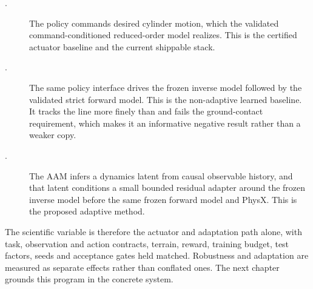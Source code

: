 \begin{description}
  \item[\ppoROM.] The policy commands desired cylinder motion, which the
    validated command-conditioned reduced-order model realizes. This is
    the certified actuator baseline and the current shippable stack.
  \item[\ppoIDFD.] The same policy interface drives the frozen inverse
    model followed by the validated strict forward model. This is the
    non-adaptive learned baseline. It tracks the line more finely than
    \ppoROM{} and fails the ground-contact requirement, which makes it an informative negative result rather than a weaker copy.
  \item[\ppoIDAAMFD.] The AAM infers a dynamics latent from causal
    observable history, and that latent conditions a small bounded
    residual adapter around the frozen inverse model before the same
    frozen forward model and PhysX. This is the proposed adaptive
    method.
\end{description}

The scientific variable is therefore the actuator and adaptation path
alone, with task, observation and action contracts, terrain, reward,
training budget, test factors, seeds and acceptance gates held matched.
Robustness and adaptation are measured as separate effects rather than
conflated ones. The next chapter grounds this program in the concrete
system.

